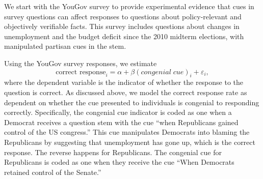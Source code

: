 \documentclass[12pt, letterpaper]{article}
\begin{document}
We start with the YouGov survey to provide experimental evidence that cues in survey questions can affect responses to questions about policy-relevant and objectively verifiable facts. This survey includes questions about changes in unemployment and the budget deficit since the 2010 midterm elections, with manipulated partisan cues in the stem. 

Using the YouGov survey responses, we estimate
\begin{equation}\label{eq:pgap-yougov}
\text{correct response}_{i} = \alpha + \beta (congenial \; cue)_i  +\varepsilon_{i},
\end{equation}
where the dependent variable is the indicator of whether the response to the question is correct.
As discussed above, we model the correct response rate as dependent on whether the cue presented to individuals is congenial to responding correctly. Specifically, the congenial cue indicator is coded as one when a Democrat receives a question stem with the cue ``when Republicans gained control of the US congress.'' This cue manipulates Democrats into blaming the Republicans by suggesting that unemployment has gone up, which is the correct response. The reverse happens for Republicans. The congenial cue for Republicans is coded as one when they receive the cue ``When Democrats retained control of the Senate.''
\end{document}
